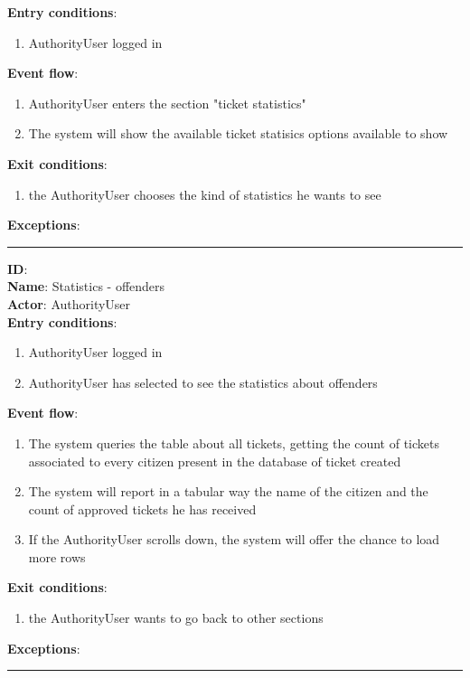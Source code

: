     \textbf{Entry conditions}:
    \begin{enumerate}
      \item{AuthorityUser logged in}
    \end{enumerate}
    \textbf{Event flow}:
    \begin{enumerate}
      \item {AuthorityUser enters the section "ticket statistics"}
      \item {The system will show the available ticket statisics options available to show}
    \end{enumerate}
    \textbf{Exit conditions}:
    \begin{enumerate}
      \item{the AuthorityUser chooses the kind of statistics he wants to see}
    \end{enumerate}
    \textbf{Exceptions}:
    \begin{enumerate}
    \end{enumerate}
    \rule{\linewidth}{0.4pt}
    \textbf{ID}:  \\
    \textbf{Name}: Statistics - offenders \\
    \textbf{Actor}: AuthorityUser   \\
    \textbf{Entry conditions}:
    \begin{enumerate}
      \item{AuthorityUser logged in}
      \item{AuthorityUser has selected to see the statistics about offenders }
    \end{enumerate}
    \textbf{Event flow}:
    \begin{enumerate}
      \item{The system queries the table about all tickets, getting the count of tickets associated to every citizen present in the database of ticket created}
      \item{The system will report in a tabular way the name of the citizen and the count of approved tickets he has received}
      \item{If the AuthorityUser scrolls down, the system will offer the chance to load more rows}
    \end{enumerate}
    \textbf{Exit conditions}:
    \begin{enumerate}
      \item{the AuthorityUser wants to go back to other sections}
    \end{enumerate}
    \textbf{Exceptions}:
    \begin{enumerate}
    \end{enumerate}
    \rule{\linewidth}{0.4pt}

